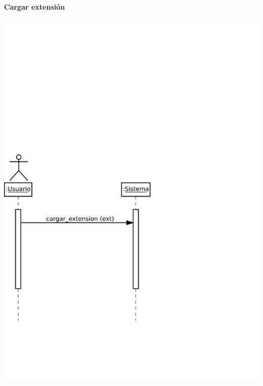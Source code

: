\paragraph{Cargar extensión}
\begin{center}
\includegraphics[scale=0.4]{cagar_extension.png} \\
\end{center}

